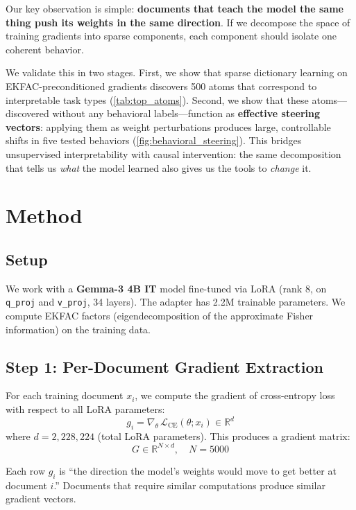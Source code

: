 \documentclass{article} %
\begin{document}
Our key observation is simple: \textbf{documents that teach the model the same thing push its weights in the same direction}. If we decompose the space of training gradients into sparse components, each component should isolate one coherent behavior.

We validate this in two stages. First, we show that sparse dictionary learning on EKFAC-preconditioned gradients discovers 500 atoms that correspond to interpretable task types (\cref{tab:top_atoms}). Second, we show that these atoms---discovered without any behavioral labels---function as \textbf{effective steering vectors}: applying them as weight perturbations produces large, controllable shifts in five tested behaviors (\cref{fig:behavioral_steering}). This bridges unsupervised interpretability with causal intervention: the same decomposition that tells us \emph{what} the model learned also gives us the tools to \emph{change} it.


\section{Method}

\subsection{Setup}

We work with a \textbf{Gemma-3 4B IT} model fine-tuned via LoRA (rank 8, on \texttt{q\_proj} and \texttt{v\_proj}, 34 layers). The adapter has 2.2M trainable parameters. We compute EKFAC factors (eigendecomposition of the approximate Fisher information) on the training data.

\subsection{Step 1: Per-Document Gradient Extraction}

For each training document $x_i$, we compute the gradient of cross-entropy loss with respect to all LoRA parameters:
\begin{equation}
g_i = \nabla_\theta \, \mathcal{L}_{\text{CE}}(\theta; x_i) \in \mathbb{R}^d
\end{equation}
where $d = 2{,}228{,}224$ (total LoRA parameters). This produces a gradient matrix:
\begin{equation}
G \in \mathbb{R}^{N \times d}, \quad N = 5000
\end{equation}

Each row $g_i$ is ``the direction the model's weights would move to get better at document $i$.'' Documents that require similar computations produce similar gradient vectors.
\end{document}
